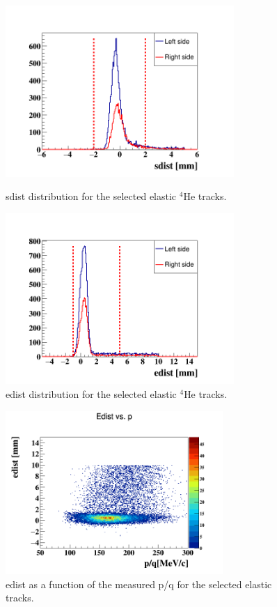 \begin{figure}[!h]
\begin{minipage}[c]{.46\linewidth}
\includegraphics[height=6.5cm]{fig/sdist_elastic_1p2GeV.png}
\caption{sdist distribution for the selected elastic $^{4}$He tracks.}
\label{fig:sdist}
\end{minipage} \hfill
\begin{minipage}[c]{.46\linewidth}
\hspace{-0.1in}\includegraphics[height=6.5cm]{fig/edist_elastic_1p2GeV.png}
\caption{edist distribution for the selected elastic $^{4}$He tracks.}
\label{fig:edist}
\end{minipage}
\end{figure}

\begin{figure}[!h]
\centering
\includegraphics[height=6.2cm]{fig/edist_poverq_elastic_1p2GeV.png}
\caption{edist as a function of the measured p/q for the selected elastic 
tracks.}
\label{fig:edistp}
\end{figure}


